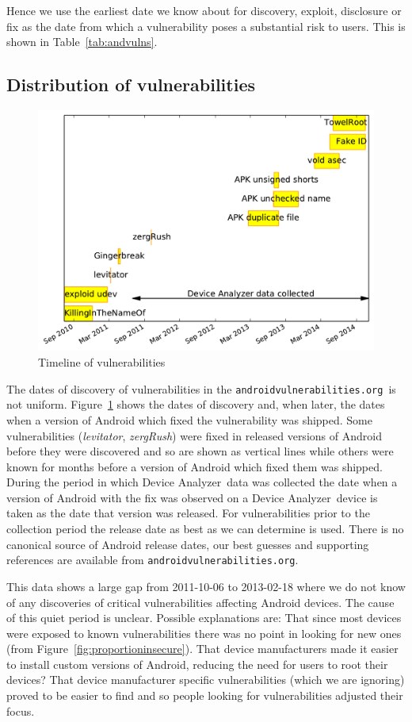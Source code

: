 \documentclass[conference,a4paper,twoside]{IEEEtran}
\newcommand{\da}{Device Analyzer}
\newcommand{\avo}{\texttt{androidvulnerabilities.org}}
\begin{document}
Hence we use the earliest date we know about for discovery, exploit, disclosure or fix as the date from which a vulnerability poses a substantial risk to users.
This is shown in Table~\ref{tab:andvulns}.


\subsection{Distribution of vulnerabilities}
\begin{figure}
 \centering
 \includegraphics[width=\columnwidth]{figures/vulnerabilities_timeline}
 \caption{Timeline of vulnerabilities}
 \label{fig:vulnerabilities_timeline}
\end{figure}

The dates of discovery of vulnerabilities in the \avo\ is not uniform.
Figure~\ref{fig:vulnerabilities_timeline} shows the dates of discovery and, when later, the dates when a version of Android which fixed the vulnerability was shipped.
Some vulnerabilities (\emph{levitator}, \emph{zergRush}) were fixed in released versions of Android before they were discovered and so are shown as vertical lines while others were known for months before a version of Android which fixed them was shipped.
During the period in which \da\ data was collected the date when a version of Android with the fix was observed on a \da\ device is taken as the date that version was released.
For vulnerabilities prior to the collection period the release date as best as we can determine is used.
There is no canonical source of Android release dates, our best guesses and supporting references are available from \avo.

This data shows a large gap from 2011-10-06 to 2013-02-18 where we do not know of any discoveries of critical vulnerabilities affecting Android devices.
The cause of this quiet period is unclear.
Possible explanations are: That since most devices were exposed to known vulnerabilities there was no point in looking for new ones (from Figure~\ref{fig:proportioninsecure}).
That device manufacturers made it easier to install custom versions of Android, reducing the need for users to root their devices?
That device manufacturer specific vulnerabilities (which we are ignoring) proved to be easier to find and so people looking for vulnerabilities adjusted their focus.
\end{document}
